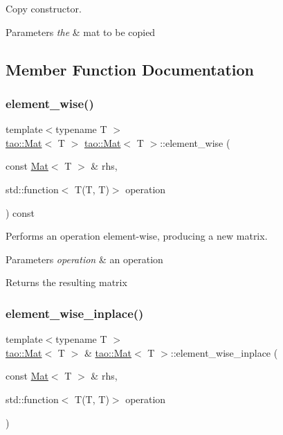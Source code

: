 Copy constructor. 


\begin{DoxyParams}{Parameters}
{\em the} & mat to be copied \\
\hline
\end{DoxyParams}


\subsection{Member Function Documentation}
\mbox{\label{classtao_1_1_mat_a6947500e8c7439144bcda888278944ff}} 
\subsubsection{\texorpdfstring{element\_wise()}{element\_wise()}}
{\footnotesize\ttfamily template$<$typename T $>$ \\
\mbox{\hyperlink{classtao_1_1_mat}{tao\+::\+Mat}}$<$ T $>$ \mbox{\hyperlink{classtao_1_1_mat}{tao\+::\+Mat}}$<$ T $>$\+::element\+\_\+wise (\begin{DoxyParamCaption}\item[{const \mbox{\hyperlink{classtao_1_1_mat}{Mat}}$<$ T $>$ \&}]{rhs,  }\item[{std\+::function$<$ T(T, T)$>$}]{operation }\end{DoxyParamCaption}) const}



Performs an operation element-\/wise, producing a new matrix. 


\begin{DoxyParams}{Parameters}
{\em operation} & an operation \\
\hline
\end{DoxyParams}
\begin{DoxyReturn}{Returns}
the resulting matrix 
\end{DoxyReturn}
\mbox{\label{classtao_1_1_mat_adf31d67ec117de70423499bfa81f124c}} 
\subsubsection{\texorpdfstring{element\_wise\_inplace()}{element\_wise\_inplace()}}
{\footnotesize\ttfamily template$<$typename T $>$ \\
\mbox{\hyperlink{classtao_1_1_mat}{tao\+::\+Mat}}$<$ T $>$ \& \mbox{\hyperlink{classtao_1_1_mat}{tao\+::\+Mat}}$<$ T $>$\+::element\+\_\+wise\+\_\+inplace (\begin{DoxyParamCaption}\item[{const \mbox{\hyperlink{classtao_1_1_mat}{Mat}}$<$ T $>$ \&}]{rhs,  }\item[{std\+::function$<$ T(T, T)$>$}]{operation }\end{DoxyParamCaption})}



